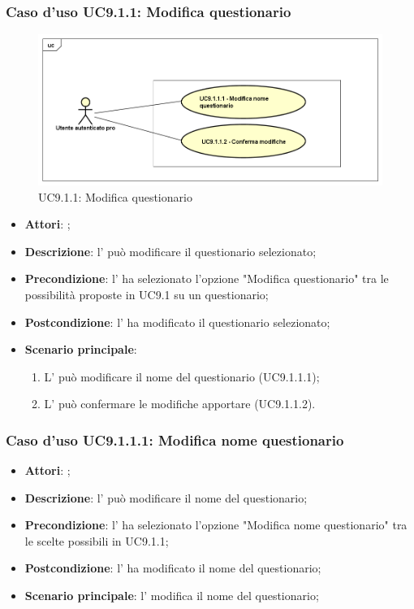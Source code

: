 			\subsubsection{Caso d'uso UC9.1.1: Modifica questionario}
			\label{UC9.1.1}
			\begin{figure}[h]
				\centering
			\includegraphics[scale=0.5,keepaspectratio]{UML/UC9_1_1.png}
				\caption{UC9.1.1: Modifica questionario}
			\end{figure}
			\FloatBarrier
			\begin{itemize}
				\item \textbf{Attori}: \uaupro{};
				\item \textbf{Descrizione}: l'\uaupro{} può modificare il questionario selezionato;
				\item \textbf{Precondizione}: l'\uaupro{} ha selezionato l'opzione "Modifica questionario" tra le possibilità proposte in UC9.1 su un questionario;
				\item \textbf{Postcondizione}: l'\uaupro{} ha modificato il questionario selezionato; 
				\item \textbf{Scenario principale}:
					\begin{enumerate}
						\item L'\uaupro{} può modificare il nome del questionario (UC9.1.1.1);
						\item L'\uaupro{} può confermare le modifiche apportare (UC9.1.1.2).
					\end{enumerate}
			\end{itemize}
								
					\subsubsection{Caso d'uso UC9.1.1.1: Modifica nome questionario}
					\label{UC9.1.1.1}
					\begin{itemize}
						\item \textbf{Attori}: \uaupro{};
						\item \textbf{Descrizione}: l'\uaupro{} può modificare il nome del questionario; 
						\item \textbf{Precondizione}: l'\uaupro{} ha selezionato l'opzione "Modifica nome questionario" tra le scelte possibili in UC9.1.1;
						\item \textbf{Postcondizione}: l'\uaupro{} ha modificato il nome del questionario; 
						\item \textbf{Scenario principale}: l'\uaupro{} modifica il nome del questionario;
					\end{itemize}
																					
